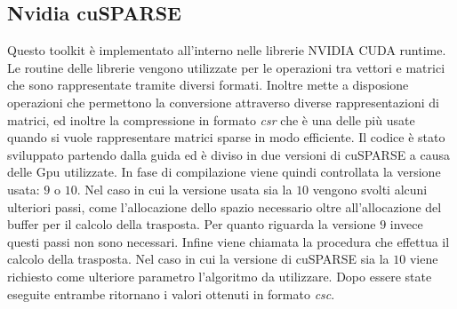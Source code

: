 \documentclass[]{IEEEtran}
\begin{document}
	\subsection{Nvidia cuSPARSE}
	Questo toolkit è implementato all'interno nelle librerie NVIDIA CUDA runtime. Le routine delle librerie vengono utilizzate per le operazioni tra vettori e matrici che sono rappresentate tramite diversi formati. Inoltre mette a disposione operazioni che permettono la conversione attraverso diverse rappresentazioni di matrici, ed inoltre la compressione in formato \textit{csr} che è una delle più usate quando si vuole rappresentare matrici sparse in modo efficiente.\newline	
	Il codice è stato sviluppato partendo dalla guida \cite{cusparse} ed è diviso in due versioni di cuSPARSE a causa delle Gpu utilizzate. In fase di compilazione viene quindi controllata la versione usata: $ 9 $ o $ 10 $.\newline
	Nel caso in cui la versione usata sia la $ 10 $ vengono svolti alcuni ulteriori passi, come l'allocazione dello spazio necessario oltre all'allocazione del buffer per il calcolo della trasposta. Per quanto riguarda la versione $ 9 $ invece questi passi non sono necessari.\newline
	Infine viene chiamata la procedura che effettua il calcolo della trasposta. Nel caso in cui la versione di cuSPARSE sia la $ 10 $ viene richiesto come ulteriore parametro l'algoritmo da utilizzare.\newline
	Dopo essere state eseguite entrambe ritornano i valori ottenuti in formato \textit{csc}.
\end{document}
